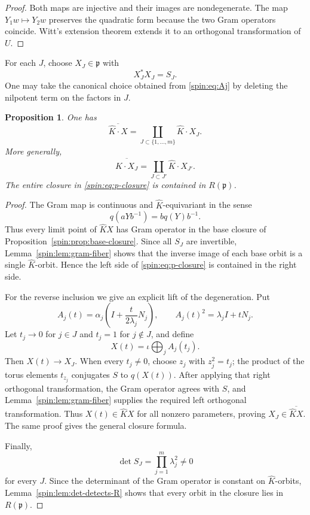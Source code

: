 \documentclass[11pt,reqno]{amsart}
\numberwithin{equation}{section}
\newtheorem{proposition}[theorem]{Proposition}
\theoremstyle{definition}
\theoremstyle{remark}
\newcommand{\fp}{\mathfrak p}
\begin{document}
\begin{proof}
Both maps are injective and their images are nondegenerate.  The map
$Y_1w\mapsto Y_2w$ preserves the quadratic form because the two Gram
operators coincide.  Witt's extension theorem extends it to an orthogonal
transformation of $U$.
\end{proof}

For each $J$, choose $X_J\in\fp$ with
\[
  X_J^*X_J=S_J.
\]
One may take the canonical choice obtained from \eqref{spin:eq:Aj} by deleting the
nilpotent term on the factors in $J$.

\begin{proposition}\label{spin:prop:p-closure}
One has
\begin{equation}\label{spin:eq:p-closure}
  \overline{\widehat K\cdot X}
  =
  \coprod_{J\subset\{1,\ldots,m\}}
  \widehat K\cdot X_J.
\end{equation}
More generally,
\[
  \overline{\widehat K\cdot X_J}
  =
  \coprod_{J\subset J'}\widehat K\cdot X_{J'}.
\]
The entire closure in \eqref{spin:eq:p-closure} is contained in $R(\fp)$.
\end{proposition}

\begin{proof}
The Gram map is continuous and $\widehat K$-equivariant in the sense
\[
  q(aYb^{-1})=bq(Y)b^{-1}.
\]
Thus every limit point of $\widehat KX$ has Gram operator in the base closure
of Proposition~\ref{spin:prop:base-closure}.  Since all $S_J$ are invertible,
Lemma~\ref{spin:lem:gram-fiber} shows that the inverse image of each base orbit is a
single $\widehat K$-orbit.  Hence the left side of \eqref{spin:eq:p-closure} is
contained in the right side.

For the reverse inclusion we give an explicit lift of the degeneration.  Put
\[
  A_j(t)=\alpha_j
  \left(I+\frac{t}{2\lambda_j}N_j\right),
  \qquad
  A_j(t)^2=\lambda_jI+tN_j.
\]
Let $t_j\to0$ for $j\in J$ and $t_j=1$ for $j\notin J$, and define
\[
  X(t)=\iota\bigoplus_jA_j(t_j).
\]
Then $X(t)\to X_J$.  When every $t_j\ne0$, choose $z_j$ with $z_j^2=t_j$;
the product of the torus elements $t_{z_j}$ conjugates $S$ to $q(X(t))$.
After applying that right orthogonal transformation, the Gram operator agrees
with $S$, and Lemma~\ref{spin:lem:gram-fiber} supplies the required left
orthogonal transformation.  Thus $X(t)\in\widehat KX$ for all nonzero
parameters, proving $X_J\in\overline{\widehat KX}$.  The same proof gives the
general closure formula.

Finally,
\[
  \det S_J=\prod_{j=1}^m\lambda_j^2\ne0
\]
for every $J$.  Since the determinant of the Gram operator is constant on
$\widehat K$-orbits, Lemma~\ref{spin:lem:det-detects-R} shows that every orbit in
the closure lies in $R(\fp)$.
\end{proof}
\end{document}
